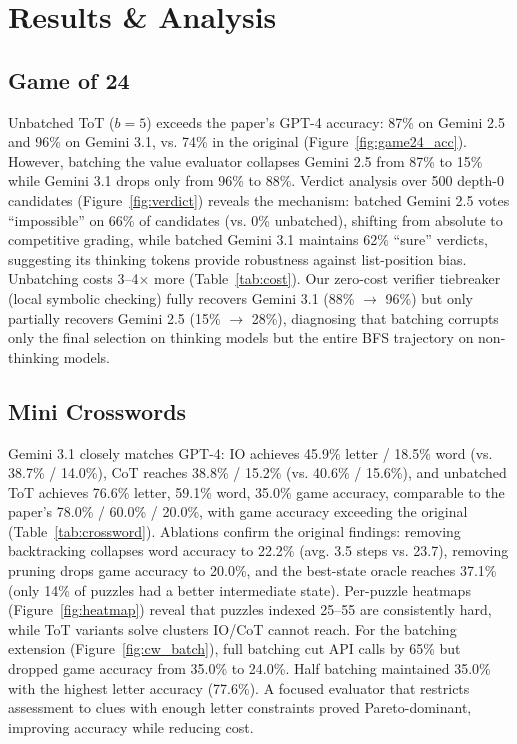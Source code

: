 \documentclass[11pt]{article}
\begin{document}
\section{Results \& Analysis}

\subsection*{Game of 24}
Unbatched ToT ($b = 5$) exceeds the paper's GPT-4 accuracy: 87\% on Gemini 2.5 and 96\% on Gemini 3.1, vs. 74\% in the original (Figure~\ref{fig:game24_acc}). However, batching the value evaluator collapses Gemini 2.5 from 87\% to 15\% while Gemini 3.1 drops only from 96\% to 88\%. Verdict analysis over 500 depth-0 candidates (Figure~\ref{fig:verdict}) reveals the mechanism: batched Gemini 2.5 votes ``impossible'' on 66\% of candidates (vs. 0\% unbatched), shifting from absolute to competitive grading, while batched Gemini 3.1 maintains 62\% ``sure'' verdicts, suggesting its thinking tokens provide robustness against list-position bias. Unbatching costs 3--4$\times$ more (Table~\ref{tab:cost}). Our zero-cost verifier tiebreaker (local symbolic checking) fully recovers Gemini 3.1 (88\% $\rightarrow$ 96\%) but only partially recovers Gemini 2.5 (15\% $\rightarrow$ 28\%), diagnosing that batching corrupts only the final selection on thinking models but the entire BFS trajectory on non-thinking models.

\subsection*{Mini Crosswords}
Gemini 3.1 closely matches GPT-4: IO achieves 45.9\% letter / 18.5\% word (vs. 38.7\% / 14.0\%), CoT reaches 38.8\% / 15.2\% (vs. 40.6\% / 15.6\%), and unbatched ToT achieves 76.6\% letter, 59.1\% word, 35.0\% game accuracy, comparable to the paper's 78.0\% / 60.0\% / 20.0\%, with game accuracy exceeding the original (Table~\ref{tab:crossword}). Ablations confirm the original findings: removing backtracking collapses word accuracy to 22.2\% (avg. 3.5 steps vs. 23.7), removing pruning drops game accuracy to 20.0\%, and the best-state oracle reaches 37.1\% (only 14\% of puzzles had a better intermediate state). Per-puzzle heatmaps (Figure~\ref{fig:heatmap}) reveal that puzzles indexed 25--55 are consistently hard, while ToT variants solve clusters IO/CoT cannot reach. For the batching extension (Figure~\ref{fig:cw_batch}), full batching cut API calls by 65\% but dropped game accuracy from 35.0\% to 24.0\%. Half batching maintained 35.0\% with the highest letter accuracy (77.6\%). A focused evaluator that restricts assessment to clues with enough letter constraints proved Pareto-dominant, improving accuracy while reducing cost.
\end{document}
